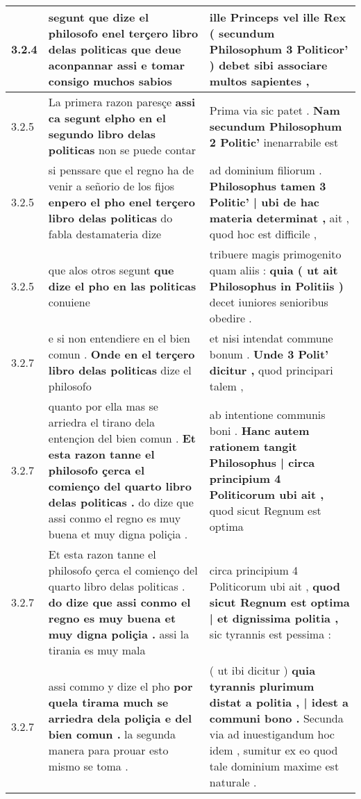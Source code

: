 \begin{tabular}{|p{1cm}|p{6.5cm}|p{6.5cm}|}
3.2.4 & segunt \textbf{ que dize el philosofo enel terçero libro delas politicas } que deue aconpannar assi e tomar consigo muchos sabios & ille Princeps vel ille Rex \textbf{ ( secundum Philosophum 3 Politicor’ ) } debet sibi associare multos sapientes , \\\hline
3.2.5 & La primera razon paresçe \textbf{ assi ca segunt elpho en el segundo libro delas politicas } non se puede contar & Prima via sic patet . \textbf{ Nam secundum Philosophum 2 Politic’ } inenarrabile est \\\hline
3.2.5 & si penssare que el regno ha de venir a señorio de los fijos \textbf{ enpero el pho enel terçero libro delas politicas } do fabla destamateria dize & ad dominium filiorum . \textbf{ Philosophus tamen 3 Politic’ | ubi de hac materia determinat , } ait , quod hoc est difficile , \\\hline
3.2.5 & que alos otros segunt \textbf{ que dize el pho en las politicas } conuiene & tribuere magis primogenito quam aliis : \textbf{ quia ( ut ait Philosophus in Politiis ) } decet iuniores senioribus obedire . \\\hline
3.2.7 & e si non entendiere en el bien comun . \textbf{ Onde en el terçero libro delas politicas } dize el philosofo & et nisi intendat commune bonum . \textbf{ Unde 3 Polit’ dicitur , } quod principari talem , \\\hline
3.2.7 & quanto por ella mas se arriedra el tirano dela entençion del bien comun . \textbf{ Et esta razon tanne el philosofo çerca el comienço del quarto libro delas politicas . } do dize que assi conmo el regno es muy buena et muy digna poliçia . & ab intentione communis boni . \textbf{ Hanc autem rationem tangit Philosophus | circa principium 4 Politicorum ubi ait , } quod sicut Regnum est optima \\\hline
3.2.7 & Et esta razon tanne el philosofo çerca el comienço del quarto libro delas politicas . \textbf{ do dize que assi conmo el regno es muy buena et muy digna poliçia . } assi la tirania es muy mala & circa principium 4 Politicorum ubi ait , \textbf{ quod sicut Regnum est optima | et dignissima politia , } sic tyrannis est pessima : \\\hline
3.2.7 & assi commo y dize el pho \textbf{ por quela tirama much se arriedra dela poliçia e del bien comun . } la segunda manera para prouar esto mismo se toma . & ( ut ibi dicitur ) \textbf{ quia tyrannis plurimum distat a politia , | idest a communi bono . } Secunda via ad inuestigandum hoc idem , sumitur ex eo quod tale dominium maxime est naturale . \\\hline

\end{tabular}

